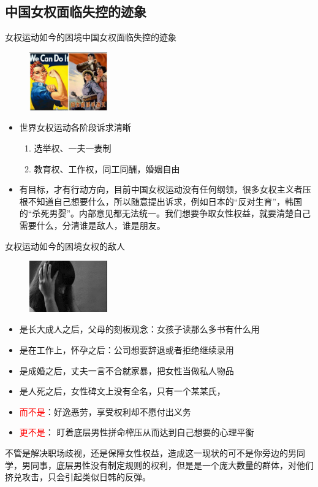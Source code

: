 \documentclass{beamer}
\begin{document}
	\subsection{中国女权面临失控的迹象}
	\begin{frame}{女权运动如今的困境}{中国女权面临失控的迹象}
		\begin{figure}
			\centering
			\includegraphics[width=0.3\textwidth]{img/图片10.png}
		\end{figure}
		\begin{itemize}
			\item 世界女权运动各阶段诉求清晰
			\begin{enumerate}
				\item 选举权、一夫一妻制
				\item 教育权、工作权，同工同酬，婚姻自由
			\end{enumerate}
			\item 有目标，才有行动方向，目前中国女权运动没有任何纲领，很多女权主义者压根不知道自己想要什么，所以随意提出诉求，例如日本的“反对生育”，韩国的“杀死男婴”。内部意见都无法统一。我们想要争取女性权益，就要清楚自己需要什么，分清谁是敌人，谁是朋友。
			
		\end{itemize}
	\end{frame}

	\begin{frame}{女权运动如今的困境}{女权的敌人}
		\begin{figure}
			\centering
			\includegraphics[width=0.3\textwidth]{img/图片11.png}
		\end{figure}
		\begin{itemize}
			\item 是长大成人之后，父母的刻板观念：女孩子读那么多书有什么用
			\item 是在工作上，怀孕之后：公司想要辞退或者拒绝继续录用
			\item 是成婚之后，丈夫一言不合就家暴，把女性当做私人物品
			\item 是人死之后，女性碑文上没有全名，只有一个某某氏，
			\item \textcolor{red}{而不是}：好逸恶劳，享受权利却不愿付出义务
			\item \textcolor{red}{更不是}： 盯着底层男性拼命榨压从而达到自己想要的心理平衡
		\end{itemize}

		不管是解决职场歧视，还是保障女性权益，造成这一现状的可不是你旁边的男同学，男同事，底层男性没有制定规则的权利，但是是一个庞大数量的群体，对他们挤兑攻击，只会引起类似日韩的反弹。
	\end{frame}
\end{document}
